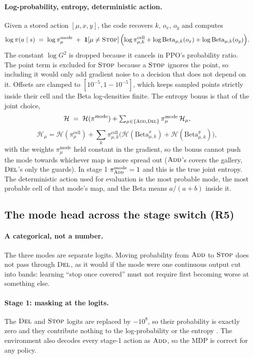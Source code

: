 \documentclass[11pt,a4paper]{article}
\begin{document}
\paragraph{Log-probability, entropy, deterministic action.}
Given a stored action $[\mu,x,y]$, the code recovers $k$, $o_x$, $o_y$ and computes
\[
  \log\pi(a\mid s) \;=\; \log\pi^{\mathrm{mode}}_\mu
  \;+\; \mathbf{1}\!\left[\mu\neq\textsc{Stop}\right]\Bigl(\log\pi^{\mathrm{cell}}_{\mu,k} + \log\mathrm{Beta}_{\mu,k}(o_x) + \log\mathrm{Beta}_{\mu,k}(o_y)\Bigr).
\]
The constant $\log G^2$ is dropped because it cancels in PPO's probability ratio. The point
term is excluded for $\textsc{Stop}$ because a $\textsc{Stop}$ ignores the point, so including it would only add
gradient noise to a decision that does not depend on it. Offsets are clamped to
$[10^{-5}, 1-10^{-5}]$, which keeps sampled points strictly inside their cell and the Beta
log-densities finite. The entropy bonus is that of the joint choice,
\[
  \mathcal{H} \;=\; \mathcal{H}(\pi^{\mathrm{mode}}) + \textstyle\sum_{\mu\in\{\textsc{Add},\textsc{Del}\}} \pi^{\mathrm{mode}}_\mu\,\mathcal{H}_\mu,
\]
\[
  \mathcal{H}_\mu = \mathcal{H}(\pi^{\mathrm{cell}}_\mu)
  + \textstyle\sum_k \pi^{\mathrm{cell}}_{\mu,k}\bigl(\mathcal{H}(\mathrm{Beta}^x_{\mu,k}) + \mathcal{H}(\mathrm{Beta}^y_{\mu,k})\bigr),
\]
with the weights $\pi^{\mathrm{mode}}_\mu$ held constant in the gradient, so the bonus cannot
push the mode towards whichever map is more spread out ($\textsc{Add}$'s covers the gallery, $\textsc{Del}$'s
only the guards). In stage 1 $\pi^{\mathrm{mode}}_{\textsc{Add}}=1$ and this is the true joint entropy.
The deterministic action used for evaluation is the most probable mode, the most probable
cell of that mode's map, and the Beta means $a/(a+b)$ inside it.

\subsection{The mode head across the stage switch (R5)}

\paragraph{A categorical, not a number.}
The three modes are separate logits. Moving probability from $\textsc{Add}$ to $\textsc{Stop}$ does not pass
through $\textsc{Del}$, as it would if the mode were one continuous output cut into bands: learning
``stop once covered'' must not require first becoming worse at something else.

\paragraph{Stage 1: masking at the logits.}
The $\textsc{Del}$ and $\textsc{Stop}$ logits are replaced by $-10^{8}$, so their probability is exactly zero
and they contribute nothing to the log-probability or the entropy \cite{huang2022masking}.
The environment also decodes every stage-1 action as $\textsc{Add}$, so the MDP is correct for any
policy.
\end{document}
